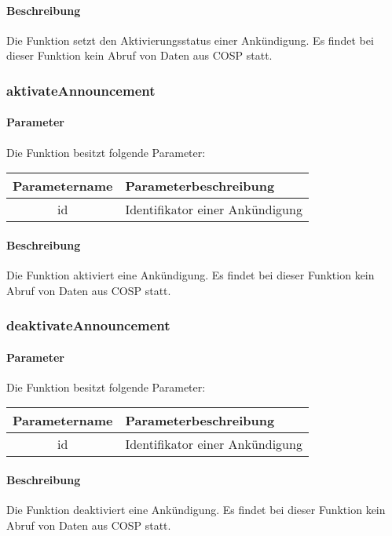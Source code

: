 \paragraph{Beschreibung} Die Funktion setzt den Aktivierungsstatus einer Ankündigung. Es findet bei dieser Funktion kein Abruf von Daten aus {\glqq COSP\grqq} statt.
\subsubsection{aktivateAnnouncement}
\paragraph{Parameter} Die Funktion besitzt folgende Parameter:
\begin{table}[H]
	\begin{tabular}{|c|p{11cm}|}
		\hline
		\textbf{Parametername} & \textbf{Parameterbeschreibung} \\ \hline
		id    & Identifikator einer Ankündigung \\ \hline
	\end{tabular}
\end{table}
\paragraph{Beschreibung} Die Funktion aktiviert eine Ankündigung. Es findet bei dieser Funktion kein Abruf von Daten aus {\glqq COSP\grqq} statt.
\subsubsection{deaktivateAnnouncement}
\paragraph{Parameter} Die Funktion besitzt folgende Parameter:
\begin{table}[H]
	\begin{tabular}{|c|p{11cm}|}
		\hline
		\textbf{Parametername} & \textbf{Parameterbeschreibung} \\ \hline
		id    & Identifikator einer Ankündigung \\ \hline
	\end{tabular}
\end{table}
\paragraph{Beschreibung} Die Funktion deaktiviert eine Ankündigung. Es findet bei dieser Funktion kein Abruf von Daten aus {\glqq COSP\grqq} statt.
